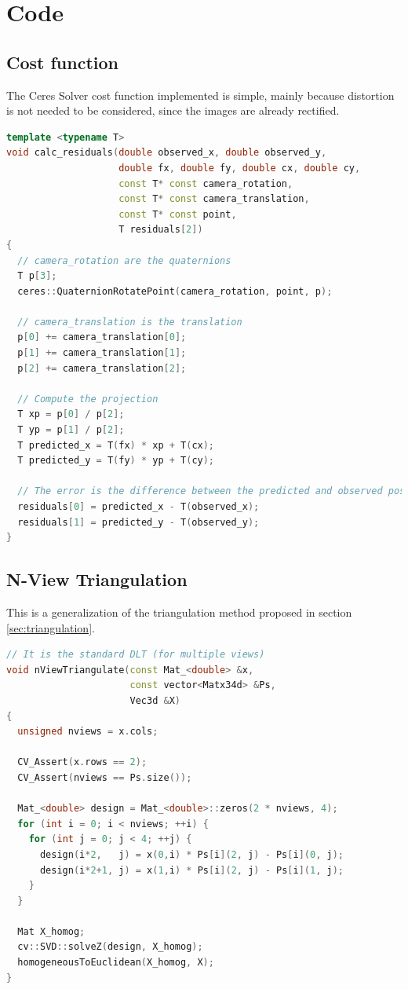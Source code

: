 \newpage
\section{Code}
\subsection{Cost function}
\label{sec:ceres_impl}

The Ceres Solver cost function implemented is simple, mainly because distortion is not needed to be considered, since the images are already rectified.

\begin{lstlisting}[language=C++, label=code:cost_function, caption={Cost function}]
template <typename T>
void calc_residuals(double observed_x, double observed_y,
                    double fx, double fy, double cx, double cy,
                    const T* const camera_rotation,
                    const T* const camera_translation,
                    const T* const point,
                    T residuals[2])
{
  // camera_rotation are the quaternions
  T p[3];
  ceres::QuaternionRotatePoint(camera_rotation, point, p);

  // camera_translation is the translation
  p[0] += camera_translation[0];
  p[1] += camera_translation[1];
  p[2] += camera_translation[2];

  // Compute the projection
  T xp = p[0] / p[2];
  T yp = p[1] / p[2];
  T predicted_x = T(fx) * xp + T(cx);
  T predicted_y = T(fy) * yp + T(cy);

  // The error is the difference between the predicted and observed position.
  residuals[0] = predicted_x - T(observed_x);
  residuals[1] = predicted_y - T(observed_y);
}
\end{lstlisting}



\subsection{N-View Triangulation}
\label{sec:triangulation_impl}

This is a generalization of the triangulation method proposed in section \ref{sec:triangulation}.

\begin{lstlisting}[language=C++, label=code:triangulation, caption={Triangulation}]
// It is the standard DLT (for multiple views)
void nViewTriangulate(const Mat_<double> &x,
                      const vector<Matx34d> &Ps,
                      Vec3d &X)
{
  unsigned nviews = x.cols;

  CV_Assert(x.rows == 2);
  CV_Assert(nviews == Ps.size());

  Mat_<double> design = Mat_<double>::zeros(2 * nviews, 4);
  for (int i = 0; i < nviews; ++i) {
    for (int j = 0; j < 4; ++j) {
      design(i*2,   j) = x(0,i) * Ps[i](2, j) - Ps[i](0, j);
      design(i*2+1, j) = x(1,i) * Ps[i](2, j) - Ps[i](1, j);
    }
  }

  Mat X_homog;
  cv::SVD::solveZ(design, X_homog);
  homogeneousToEuclidean(X_homog, X);
}
\end{lstlisting}

